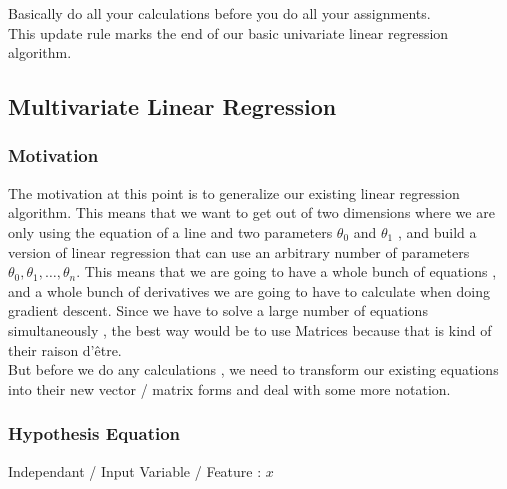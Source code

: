 Basically do all your calculations before you do all your assignments.\\

This update rule marks the end of our basic univariate linear regression
algorithm.\\

\subsubsectionend

\subsectionend

\subsection{Multivariate Linear Regression}
\label{ssec:multivariate_linear_regression}

\subsubsection{Motivation}
\label{sssec:motivation}

The motivation at this point is to generalize our existing linear regression
algorithm. This means that we want to get out of two dimensions where we are
only using the equation of a line and two parameters \( \theta_0 \) and \(
	\theta_1 \) , and build a version of linear regression that can use an
arbitrary number of parameters \( \theta_0 , \theta_1 , \ldots , \theta_n \).
This means that we are going to have a whole bunch of equations , and a whole
bunch of derivatives we are going to have to calculate when doing gradient
descent. Since we have to solve a large number of equations simultaneously , the
best way would be to use Matrices because that is kind of their raison d'être.\\

But before we do any calculations , we need to transform our existing
equations into their new vector / matrix forms and deal with some more
notation.\\


\subsubsectionend
\subsubsection{Hypothesis Equation}
\label{sssec:equation}

 Independant / Input Variable / Feature : $ x\; $ 

